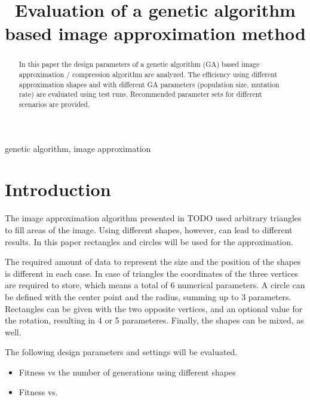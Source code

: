 \documentclass[conference]{IEEEtran}
\begin{document}
\title{Evaluation of a genetic algorithm based image approximation method}

\author{
}

\maketitle

\begin{abstract}
In this paper the design parameters of a
genetic algorithm (GA) based image
approximation / compression algorithm are
analyzed. The efficiency using different
approximation shapes and with different GA
parameters (population size, mutation rate)
are evaluated using test runs. Recommended
parameter sets for different scenarios are
provided.
\end{abstract}

\begin{IEEEkeywords}
genetic algorithm, image approximation
\end{IEEEkeywords}

\section{Introduction}

The image approximation algorithm presented in TODO used arbitrary triangles to
fill areas of the image. Using different shapes, however, can lead to different
results. In this paper rectangles and circles will be used for the approximation.

The required amount of data to represent the size and the position of the shapes
is different in each case. In case of triangles the coordinates of the three
vertices are required to store, which means a total of 6 numerical parameters.
A circle can be defined with the center point and the radius, summing up to 3 parameters.
Rectangles can be given with the two opposite vertices, and an optional value
for the rotation, resulting in 4 or 5 parameteres. Finally, the shapes can be mixed,
as well.

The following design parameters and settings will be evaluated.

\begin{itemize}

  \item{Fitness vs the number of generations using different shapes}

  \item{Fitness vs. }

\end{itemize}
\end{document}
